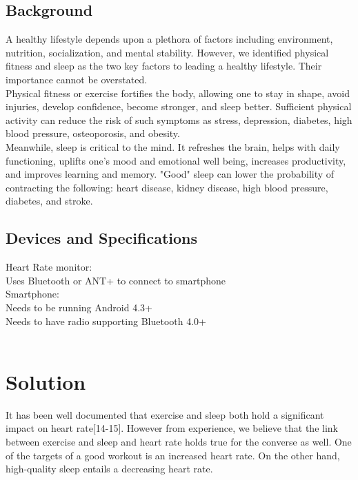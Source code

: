 \documentclass[letterpaper,english, 12pt]{scrreprt}
\begin{document}
\subsection{Background}
A healthy lifestyle depends upon a plethora of factors including environment, nutrition, socialization, and mental stability. However, we identified physical fitness and sleep as the two key factors to leading a healthy lifestyle. Their importance cannot be overstated.\\
 
Physical fitness or exercise fortifies the body, allowing one to stay in shape, avoid injuries, develop confidence, become stronger, and sleep better. Sufficient physical activity can reduce the risk of such symptoms as stress, depression, diabetes, high blood pressure, osteoporosis, and obesity.\\
 
Meanwhile, sleep is critical to the mind. It refreshes the brain, helps with daily functioning, uplifts one's mood and emotional well being, increases productivity, and improves learning and memory. "Good" sleep can lower the probability of contracting the following: heart disease, kidney disease, high blood pressure, diabetes, and stroke.\\
 
\subsection{Devices and Specifications}

Heart Rate monitor: \\
Uses Bluetooth or ANT+ to connect to smartphone \\

Smartphone: \\
Needs to be running Android 4.3+ \\
Needs to have radio supporting Bluetooth 4.0+  \\
\\

\section{Solution}
It has been well documented that exercise and sleep both hold a significant impact on heart rate[14-15]. However from experience, we believe that the link between exercise and sleep and heart rate holds true for the converse as well. One of the targets of a good workout is an increased heart rate. On the other hand, high-quality sleep entails a decreasing heart rate.\\
			 
\end{document}

